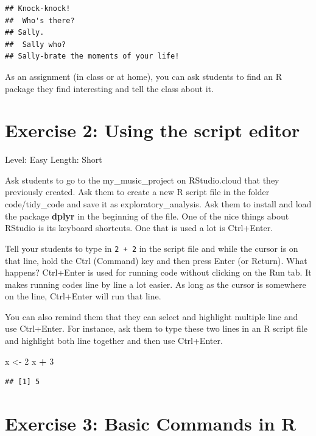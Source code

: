 \documentclass[]{book}
\newenvironment{Shaded}{\begin{snugshade}}{\end{snugshade}}
\newcommand{\DecValTok}[1]{\textcolor[rgb]{0.00,0.00,0.81}{#1}}
\newcommand{\NormalTok}[1]{#1}
\newcommand{\OperatorTok}[1]{\textcolor[rgb]{0.81,0.36,0.00}{\textbf{#1}}}
\newcommand{\StringTok}[1]{\textcolor[rgb]{0.31,0.60,0.02}{#1}}
\begin{document}
\begin{verbatim}
## Knock-knock!
##  Who's there?
## Sally.
##  Sally who?
## Sally-brate the moments of your life!
\end{verbatim}

As an assignment (in class or at home), you can ask students to find an R package they find interesting and tell the class about it.

\hypertarget{exercise-2-using-the-script-editor}{%
\section*{Exercise 2: Using the script editor}\label{exercise-2-using-the-script-editor}}

Level: Easy
Length: Short

Ask students to go to the my\_music\_project on RStudio.cloud that they previously created. Ask them to create a new R script file in the folder code/tidy\_code and save it as exploratory\_analysis. Ask them to install and load the package \textbf{dplyr} in the beginning of the file. One of the nice things about RStudio is its keyboard shortcuts. One that is used a lot is Ctrl+Enter.

Tell your students to type in \texttt{2\ +\ 2} in the script file and while the cursor is on that line, hold the Ctrl (Command) key and then press Enter (or Return). What happens? Ctrl+Enter is used for running code without clicking on the Run tab. It makes running codes line by line a lot easier. As long as the cursor is somewhere on the line, Ctrl+Enter will run that line.

You can also remind them that they can select and highlight multiple line and use Ctrl+Enter. For instance, ask them to type these two lines in an R script file and highlight both line together and then use Ctrl+Enter.

\begin{Shaded}
\begin{Highlighting}[]
\NormalTok{x <-}\StringTok{ }\DecValTok{2}
\NormalTok{x }\OperatorTok{+}\StringTok{ }\DecValTok{3}
\end{Highlighting}
\end{Shaded}

\begin{verbatim}
## [1] 5
\end{verbatim}

\hypertarget{exercise-3-basic-commands-in-r}{%
\section*{Exercise 3: Basic Commands in R}\label{exercise-3-basic-commands-in-r}}
\end{document}
